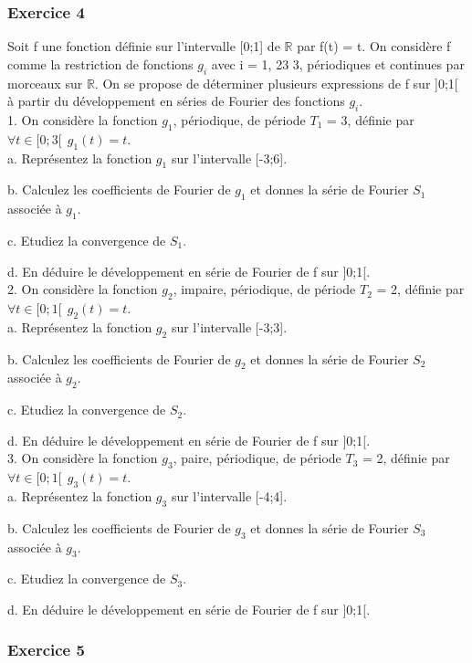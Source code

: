 \documentclass[11pt]{report}
\begin{document}
	
	\subsubsection{Exercice 4}
	Soit f une fonction définie sur l'intervalle [0;1] de $\mathbb{R}$ par f(t) = t.
	On considère f comme la restriction de fonctions $g_i$ avec i = 1, 23 3, périodiques et continues par morceaux sur $\mathbb{R}$. On se propose de déterminer plusieurs expressions de f sur ]0;1[ à partir du développement en séries de Fourier des fonctions $g_i$.\\
	
	1. On considère la fonction $g_1$, périodique, de période $T_1$ = 3, définie par $\forall t \in [0;3[~~ g_1(t) = t$.\\
	a. Représentez la fonction $g_1$ sur l'intervalle [-3;6].
	
	b. Calculez les coefficients de Fourier de $g_1$ et donnes la série de Fourier $S_1$ associée à $g_1$.
	
	
	c. Etudiez la convergence de $S_1$.
	
	d. En déduire le développement en série de Fourier de f sur ]0;1[.\\
	
	2. On considère la fonction $g_2$, impaire, périodique, de période $T_2$ = 2, définie par $\forall t \in [0;1[~~ g_2(t) = t$.\\
	a. Représentez la fonction $g_2$ sur l'intervalle [-3;3].
	
	b. Calculez les coefficients de Fourier de $g_2$ et donnes la série de Fourier $S_2$ associée à $g_2$.
	
	c. Etudiez la convergence de $S_2$.
	
	d. En déduire le développement en série de Fourier de f sur ]0;1[.\\
	
	3. On considère la fonction $g_3$, paire, périodique, de période $T_3$ = 2, définie par $\forall t \in [0;1[~~ g_3(t) = t$.\\
	a. Représentez la fonction $g_3$ sur l'intervalle [-4;4].
	
	b. Calculez les coefficients de Fourier de $g_3$ et donnes la série de Fourier $S_3$ associée à $g_3$.
	
	c. Etudiez la convergence de $S_3$.
	
	d. En déduire le développement en série de Fourier de f sur ]0;1[.\\
	
	
	\subsubsection{Exercice 5}
	
\end{document}
